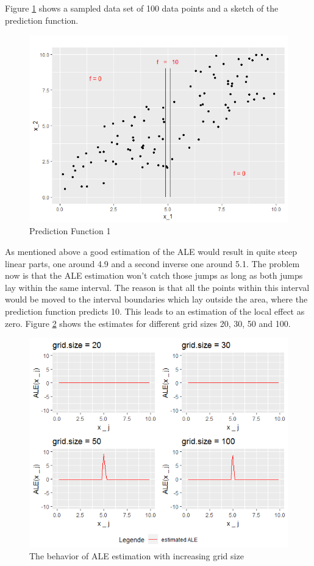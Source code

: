 \documentclass[
]{krantz}
\begin{document}
Figure \ref{fig:pwcexample4datasetpredf} shows a sampled data set of 100 data points and a sketch of the prediction function.

\begin{figure}
\includegraphics[width=1\linewidth]{images/ALE_2_pwc_example4_dataset_predf_} \caption{Prediction Function 1}\label{fig:pwcexample4datasetpredf}
\end{figure}



As mentioned above a good estimation of the ALE would result in quite steep linear parts, one around 4.9 and a second inverse one around 5.1. The problem now is that the ALE estimation won't catch those jumps as long as both jumps lay within the same interval. The reason is that all the points within this interval would be moved to the interval boundaries which lay outside the area, where the prediction function predicts 10. This leads to an estimation of the local effect as zero.
Figure \ref{fig:pwcexample44plots} shows the estimates for different grid sizes 20, 30, 50 and 100.

\begin{figure}
\includegraphics[width=1\linewidth]{images/ALE_2_pwc_example4_4plots_} \caption{The behavior of ALE estimation with increasing grid size}\label{fig:pwcexample44plots}
\end{figure}
\end{document}
